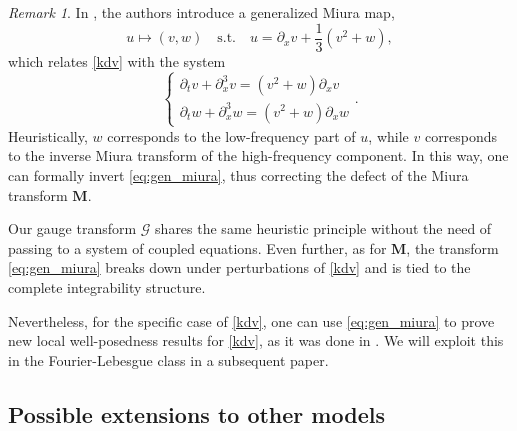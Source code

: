 \documentclass[%
11pt,  reqno]{amsart}
\newcommand{\red}{\color{red}}
\newcommand{\5}{\textup{V}}
\newcommand{\noi}{\noindent}
\newcommand{\dx}{\partial_x}
\newcommand{\dt}{\partial_t}
\theoremstyle{remark}
\newtheorem{remark}[theorem]{Remark}
\newcommand{\MMb}{\mathbf{M}}
\newcommand{\Gc}{\mathcal{G}}
\numberwithin{equation}{section}
\numberwithin{theorem}{section}
\newcommand{\simao}[1]{\marginpar{\color{red} $\Leftarrow\Leftarrow\Leftarrow$}{\smallskip \noi\color{red}SIMAO: #1}\smallskip}
\begin{document}
\begin{remark}
In \cite{CCT_ill}, the authors introduce a generalized Miura map,
\begin{equation}\label{eq:gen_miura}
u\mapsto (v,w)\quad \mbox{s.t.}\quad u=\dx v + \frac13(v^2 + w),
\end{equation}
which relates \eqref{kdv} with the system
\begin{equation}\label{eq:sistema_tao}
\begin{cases}
\dt v + \dx^3 v = (v^2 + w)\dx v\\ \dt w + \dx^3 w = (v^2 + w)\dx w
\end{cases}.
\end{equation}
Heuristically, $w$ corresponds to the low-frequency part of $u$, while $v$ corresponds to the inverse Miura transform of the high-frequency component. In this way, one can formally invert \eqref{eq:gen_miura}, thus correcting the defect of the Miura transform $\MMb$.

Our gauge transform $\Gc$ shares the same heuristic principle without the need of passing to a system of coupled equations. Even further, as for $\MMb$, the transform \eqref{eq:gen_miura} breaks down under perturbations of \eqref{kdv} and is tied to the complete integrability structure.

Nevertheless, for the specific case of \eqref{kdv}, one can use \eqref{eq:gen_miura} to prove new local well-posedness results for \eqref{kdv}, as it was done in \cite{CCT_ill}. We will exploit this in the Fourier-Lebesgue class in a subsequent paper.
\end{remark}


        
       
		
		

    

\subsection{Possible extensions to other models}
\end{document}
